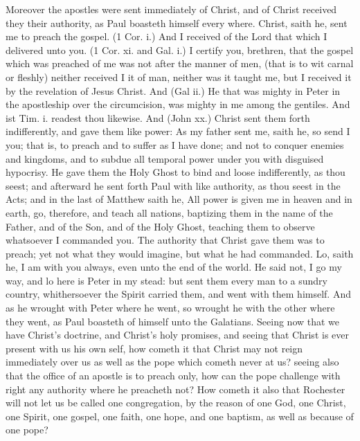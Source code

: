 Moreover the apostles were sent immediately of Christ, 
and of Christ received they their authority, as Paul boasteth 
himself every where. Christ, saith he, sent me to preach 
the gospel. (1 Cor. i.) And I received of the Lord that 
which I delivered unto you. (1 Cor. xi. and Gal. i.) I certify
you, brethren, that the gospel which was preached of 
me was not after the manner of men, (that is to wit carnal
or fleshly) neither received I it of man, neither was 
it taught me, but I received it by the revelation of Jesus 
Christ. And (Gal ii.) He that was mighty in Peter in the 
apostleship over the circumcision, was mighty in me 
among the gentiles. And ist Tim. i. readest thou likewise.
And (John xx.) Christ sent them forth indifferently, 
and gave them like power: As my father sent me, saith he, 
so send I you; that is, to preach and to suffer as I have 
done; and not to conquer enemies and kingdoms, and to subdue
all temporal power under you with disguised hypocrisy. 
He gave them the Holy Ghost to bind and loose indifferently, 
as thou seest; and afterward he sent forth Paul with like 
authority, as thou seest in the Acts; and in the last of Matthew
saith he, All power is given me in heaven and in 
earth, go, therefore, and teach all nations, baptizing them in 
the name of the Father, and of the Son, and of the Holy 
Ghost, teaching them to observe whatsoever I commanded 
you. The authority that Christ gave them was to preach; 
yet not what they would imagine, but what he had commanded.
Lo, saith he, I am with you always, even unto 
the end of the world. He said not, I go my way, and lo here 
is Peter in my stead: but sent them every man to a sundry 
country, whithersoever the Spirit carried them, and went 
with them himself. And as he wrought with Peter where 
he went, so wrought he with the other where they went, 
as Paul boasteth of himself unto the Galatians. Seeing now 
that we have Christ's doctrine, and Christ's holy promises, 
and seeing that Christ is ever present with us his own self, 
how cometh it that Christ may not reign immediately over 
us as well as the pope which cometh never at us? seeing 
also that the office of an apostle is to preach only, how can 
the pope challenge with right any authority where he 
preacheth not? How cometh it also that Rochester will 
not let us be called one congregation, by the reason of one 
God, one Christ, one Spirit, one gospel, one faith, one 
hope, and one baptism, as well as because of one pope? 

